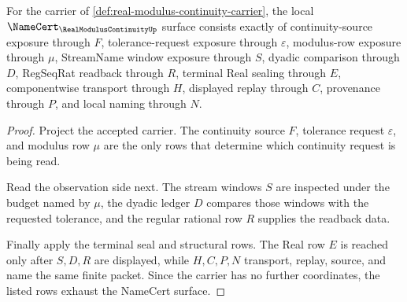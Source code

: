 \begin{theorem}
\label{thm:real-modulus-continuity-namecert-obligations}
For the carrier of \autoref{def:real-modulus-continuity-carrier}, the local $\NameCert_{\RealModulusContinuityUp}$ surface consists exactly of continuity-source exposure through $F$, tolerance-request exposure through $\varepsilon$, modulus-row exposure through $\mu$, StreamName window exposure through $S$, dyadic comparison through $D$, RegSeqRat readback through $R$, terminal Real sealing through $E$, componentwise transport through $H$, displayed replay through $C$, provenance through $P$, and local naming through $N$.
\end{theorem}
\begin{proof}
Project the accepted carrier. The continuity source $F$, tolerance request $\varepsilon$, and modulus row $\mu$ are the only rows that determine which continuity request is being read.

Read the observation side next. The stream windows $S$ are inspected under the budget named by $\mu$, the dyadic ledger $D$ compares those windows with the requested tolerance, and the regular rational row $R$ supplies the readback data.

Finally apply the terminal seal and structural rows. The Real row $E$ is reached only after $S,D,R$ are displayed, while $H,C,P,N$ transport, replay, source, and name the same finite packet. Since the carrier has no further coordinates, the listed rows exhaust the NameCert surface.
\end{proof}

